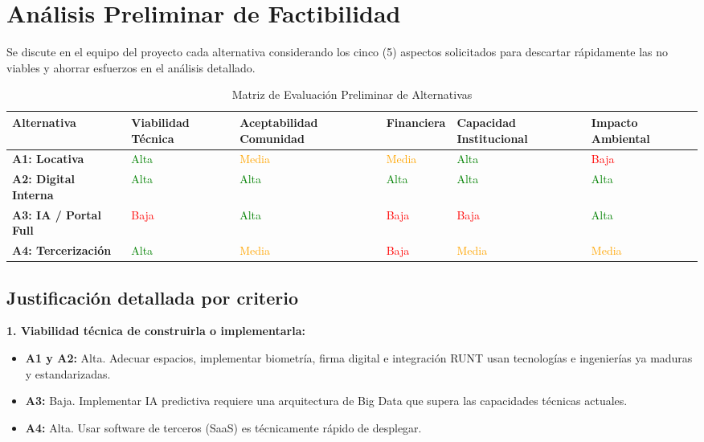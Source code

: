 \section{Análisis Preliminar de Factibilidad}

Se discute en el equipo del proyecto cada alternativa considerando los cinco (5) aspectos solicitados para descartar rápidamente las no viables y ahorrar esfuerzos en el análisis detallado.

\begin{table}[H]
\centering
\caption{Matriz de Evaluación Preliminar de Alternativas}
\label{tab:evaluacion}
\renewcommand{\arraystretch}{1.3}
\begin{tabular}{|p{3.2cm}|p{2.2cm}|p{2.7cm}|p{2.2cm}|p{2.4cm}|p{2cm}|}
\hline
\textbf{Alternativa} & \textbf{Viabilidad Técnica} & \textbf{Aceptabilidad Comunidad} & \textbf{Financiera} & \textbf{Capacidad Institucional} & \textbf{Impacto Ambiental} \\ \hline
\textbf{A1: Locativa} & \textcolor{green}{Alta} & \textcolor{orange}{Media} & \textcolor{orange}{Media} & \textcolor{green}{Alta} & \textcolor{red}{Baja} \\ \hline
\textbf{A2: Digital Interna} & \textcolor{green}{Alta} & \textcolor{green}{Alta} & \textcolor{green}{Alta} & \textcolor{green}{Alta} & \textcolor{green}{Alta} \\ \hline
\textbf{A3: IA / Portal Full} & \textcolor{red}{Baja} & \textcolor{green}{Alta} & \textcolor{red}{Baja} & \textcolor{red}{Baja} & \textcolor{green}{Alta} \\ \hline
\textbf{A4: Tercerización} & \textcolor{green}{Alta} & \textcolor{orange}{Media} & \textcolor{red}{Baja} & \textcolor{orange}{Media} & \textcolor{orange}{Media} \\ \hline
\end{tabular}
\end{table}

\subsection*{Justificación detallada por criterio}

\textbf{1. Viabilidad técnica de construirla o implementarla:}
\begin{itemize}
    \item \textbf{A1 y A2:} Alta. Adecuar espacios, implementar biometría, firma digital e integración RUNT usan tecnologías e ingenierías ya maduras y estandarizadas.
    \item \textbf{A3:} Baja. Implementar IA predictiva requiere una arquitectura de Big Data que supera las capacidades técnicas actuales.
    \item \textbf{A4:} Alta. Usar software de terceros (SaaS) es técnicamente rápido de desplegar.
\end{itemize}


